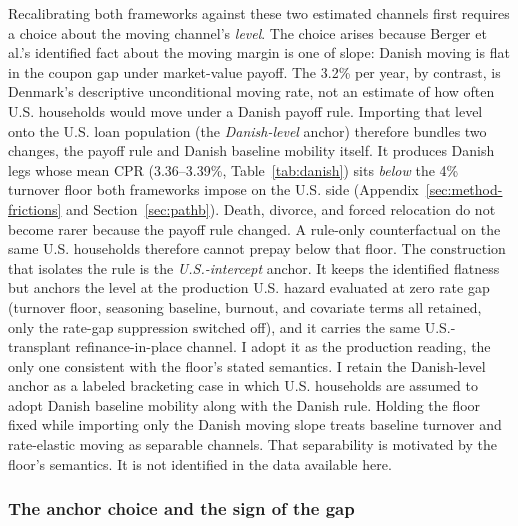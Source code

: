 \documentclass[12pt]{article}
\begin{document}
Recalibrating both frameworks against these two estimated channels first requires a choice about the moving channel's \emph{level}. The choice arises because Berger et al.'s identified fact about the moving margin is one of slope: Danish moving is flat in the coupon gap under market-value payoff. The 3.2\% per year, by contrast, is Denmark's descriptive unconditional moving rate, not an estimate of how often U.S. households would move under a Danish payoff rule. Importing that level onto the U.S. loan population (the \emph{Danish-level} anchor) therefore bundles two changes, the payoff rule and Danish baseline mobility itself. It produces Danish legs whose mean CPR (3.36--3.39\%, Table~\ref{tab:danish}) sits \emph{below} the 4\% turnover floor both frameworks impose on the U.S. side (Appendix~\ref{sec:method-frictions} and Section~\ref{sec:pathb}). Death, divorce, and forced relocation do not become rarer because the payoff rule changed. A rule-only counterfactual on the same U.S. households therefore cannot prepay below that floor. The construction that isolates the rule is the \emph{U.S.-intercept} anchor. It keeps the identified flatness but anchors the level at the production U.S. hazard evaluated at zero rate gap (turnover floor, seasoning baseline, burnout, and covariate terms all retained, only the rate-gap suppression switched off), and it carries the same U.S.-transplant refinance-in-place channel. I adopt it as the production reading, the only one consistent with the floor's stated semantics. I retain the Danish-level anchor as a labeled bracketing case in which U.S. households are assumed to adopt Danish baseline mobility along with the Danish rule. Holding the floor fixed while importing only the Danish moving slope treats baseline turnover and rate-elastic moving as separable channels. That separability is motivated by the floor's semantics. It is not identified in the data available here.

\subsubsection{The anchor choice and the sign of the gap}
\end{document}

